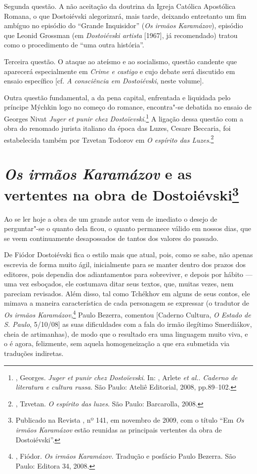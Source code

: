 Segunda questão. A não aceitação da doutrina da Igreja Católica
Apostólica Romana, o que Dostoiévski alegorizará, mais tarde,
deixando entretanto um fim ambíguo no episódio do ``Grande
Inquisidor'' (\emph{Os irmãos Karamázov}), episódio que
Leonid Grossman (em \emph{Dostoiévski artista} [1967],
já recomendado) tratou como o procedimento de ``uma outra
história''.

Terceira questão. O ataque ao ateísmo e ao socialismo, questão
candente que aparecerá especialmente em \emph{Crime e castigo}
e cujo debate será discutido em ensaio específico [cf.
\emph{A consciência em Dostoiévski}, neste volume].

Outra questão fundamental, a da pena capital, enfrentada e
liquidada pelo príncipe Mýchkin logo no começo do romance,
encontra"-se debatida no ensaio de Georges Nivat \emph{Juger
et punir chez Dostoïevski}.\footnote{, Georges.
\emph{Juger et punir chez Dostoïevski}. In: ,
Arlete \emph{et al.}. \emph{Caderno de literatura e cultura
russa}. São Paulo: Ateliê Editorial, 2008, pp.89--102.} A
ligação dessa questão com a obra do renomado jurista italiano
da época das Luzes, Cesare Beccaria, foi estabelecida também
por Tzvetan Todorov em \emph{O espírito das
Luzes}.\footnote{, Tzvetan. \emph{O espírito
das luzes}. São Paulo: Barcarolla, 2008.}

\chapter{\emph{Os irmãos Karamázov} e as vertentes na obra de
Dostoiévski\footnote{Publicado na Revista {}, nº 141, em novembro de 2009,
com o título ``Em \emph{Os irmãos Karamázov} estão reunidas as
principais vertentes da obra de Dostoiévski''.}}

Ao se ler hoje a obra de um grande autor vem de imediato o
desejo de perguntar"-se o quanto dela ficou, o quanto permanece
válido em nossos dias, que se veem continuamente desapossados de
tantos dos valores do passado.

De Fiódor Dostoiévski fica o estilo mais que atual, pois, como se sabe,
não apenas escrevia de forma muito ágil, inicialmente para se manter
dentro dos prazos dos editores, pois dependia dos adiantamentos para
sobreviver, e depois por hábito --- uma vez esboçados, ele costumava
ditar seus textos, que, muitas vezes, nem pareciam revisados. Além
disso, tal como Tchékhov em alguns de seus contos, ele mimava a maneira
característica de cada personagem se expressar (o tradutor de \emph{Os
irmãos Karamázov},\footnote{, Fiódor. \emph{Os irmãos
  Karamázov.} Tradução e posfácio Paulo Bezerra. São Paulo: Editora 34,
  2008.} Paulo Bezerra, comentou [Caderno Cultura, \emph{O Estado de S.
Paulo}, 5/10/08] as suas dificuldades com a fala do irmão ilegítimo
Smerdiákov, cheia de artimanhas), de modo que o resultado era uma
linguagem muito viva, e o é agora, felizmente, sem aquela homogeneização
a que era submetida via traduções indiretas.

